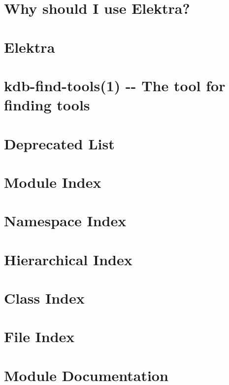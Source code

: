 \documentclass[twoside]{book}
\newcommand{\+}{\discretionary{\mbox{\scriptsize$\hookleftarrow$}}{}{}}
\begin{document}
\chapter{Why should I use Elektra?}
\label{doc_WHY_md}

\chapter{Elektra}
\label{README_md}

\chapter{kdb-\/find-\/tools(1) -\/-\/ The tool for finding tools}
\label{md_scripts_README}

\chapter{Deprecated List}
\label{deprecated}

\chapter{Module Index}

\chapter{Namespace Index}

\chapter{Hierarchical Index}

\chapter{Class Index}

\chapter{File Index}

\chapter{Module Documentation}















\end{document}
